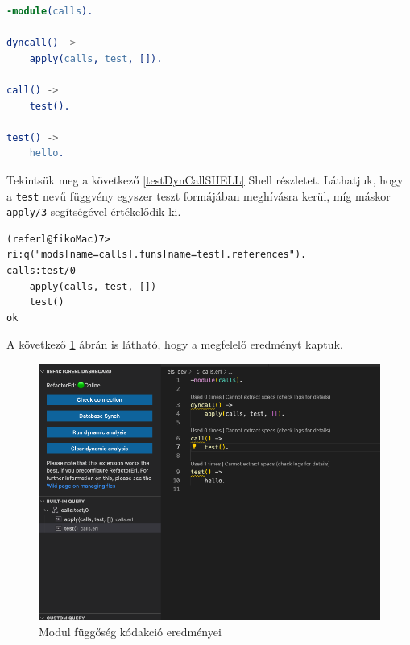 \label{testDynCallERL}
\begin{lstlisting}[language={erlang}]  
-module(calls).

dyncall() ->
    apply(calls, test, []).

call() ->
    test().

test() ->
    hello.
\end{lstlisting}

Tekintsük meg a következő \ref{testDynCallSHELL} Shell részletet. Láthatjuk, hogy a \lstinline{test} nevű függvény egyszer teszt formájában meghívásra kerül, míg máskor \lstinline{apply/3} segítségével értékelődik ki.


\lstset{caption=Függvény dinamikus hívásainak lekérdezésének eredménye, label=src:shell} \label{testDynCallSHELL}
\begin{lstlisting}[language={shell}]  
(referl@fikoMac)7> ri:q("mods[name=calls].funs[name=test].references").
calls:test/0
    apply(calls, test, [])
    test()
ok
\end{lstlisting}

A következő \ref{fig:dynCall} ábrán is látható, hogy a megfelelő eredményt kaptuk.

\begin{figure}[H]
  \centering
  \includegraphics[width=0.8\linewidth]{images/testCases/dynCall.png}
  \caption{Modul függőség kódakció eredményei}
  \label{fig:dynCall}
\end{figure}


